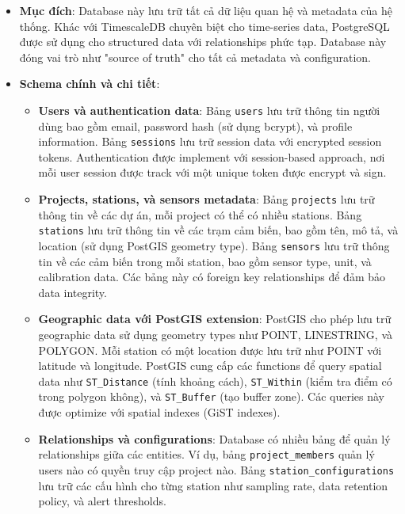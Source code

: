 \begin{itemize}
    \item \textbf{Mục đích}: Database này lưu trữ tất cả dữ liệu quan hệ và metadata của hệ thống. Khác với TimescaleDB chuyên biệt cho time-series data, PostgreSQL được sử dụng cho structured data với relationships phức tạp. Database này đóng vai trò như "source of truth" cho tất cả metadata và configuration.
    
    \item \textbf{Schema chính và chi tiết}:
        \begin{itemize}
            \item \textbf{Users và authentication data}: Bảng \texttt{users} lưu trữ thông tin người dùng bao gồm email, password hash (sử dụng bcrypt), và profile information. Bảng \texttt{sessions} lưu trữ session data với encrypted session tokens. Authentication được implement với session-based approach, nơi mỗi user session được track với một unique token được encrypt và sign.
            
            \item \textbf{Projects, stations, và sensors metadata}: Bảng \texttt{projects} lưu trữ thông tin về các dự án, mỗi project có thể có nhiều stations. Bảng \texttt{stations} lưu trữ thông tin về các trạm cảm biến, bao gồm tên, mô tả, và location (sử dụng PostGIS geometry type). Bảng \texttt{sensors} lưu trữ thông tin về các cảm biến trong mỗi station, bao gồm sensor type, unit, và calibration data. Các bảng này có foreign key relationships để đảm bảo data integrity.
            
            \item \textbf{Geographic data với PostGIS extension}: PostGIS cho phép lưu trữ geographic data sử dụng geometry types như POINT, LINESTRING, và POLYGON. Mỗi station có một location được lưu trữ như POINT với latitude và longitude. PostGIS cung cấp các functions để query spatial data như \texttt{ST\_Distance} (tính khoảng cách), \texttt{ST\_Within} (kiểm tra điểm có trong polygon không), và \texttt{ST\_Buffer} (tạo buffer zone). Các queries này được optimize với spatial indexes (GiST indexes).
            
            \item \textbf{Relationships và configurations}: Database có nhiều bảng để quản lý relationships giữa các entities. Ví dụ, bảng \texttt{project\_members} quản lý users nào có quyền truy cập project nào. Bảng \texttt{station\_configurations} lưu trữ các cấu hình cho từng station như sampling rate, data retention policy, và alert thresholds.
        \end{itemize}
    

\end{itemize}
